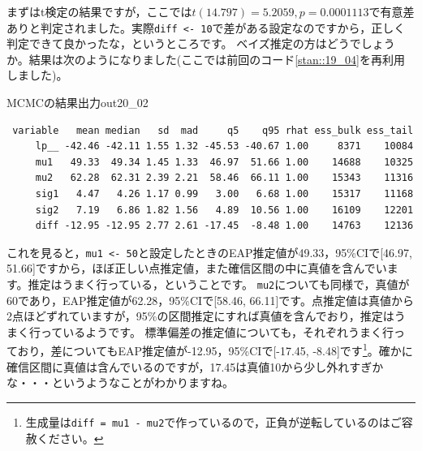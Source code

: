 \documentclass{ltjsbook}
\begin{document}
まずはt検定の結果ですが，ここでは$t(14.797)=5.2059,p=0.0001113$で有意差ありと判定されました。実際\verb|diff <- 10|で差がある設定なのですから，正しく判定できて良かったな，というところです。
ベイズ推定の方はどうでしょうか。結果は次のようになりました(ここでは前回のコード\ref{stan::19_04}を再利用しました)。
\begin{SCcmd}{MCMCの結果出力}{out20_02}
\begin{verbatim}
 variable   mean median   sd  mad     q5    q95 rhat ess_bulk ess_tail
     lp__ -42.46 -42.11 1.55 1.32 -45.53 -40.67 1.00     8371    10084
     mu1   49.33  49.34 1.45 1.33  46.97  51.66 1.00    14688    10325
     mu2   62.28  62.31 2.39 2.21  58.46  66.11 1.00    15343    11316
     sig1   4.47   4.26 1.17 0.99   3.00   6.68 1.00    15317    11168
     sig2   7.19   6.86 1.82 1.56   4.89  10.56 1.00    16109    12201
     diff -12.95 -12.95 2.77 2.61 -17.45  -8.48 1.00    14763    12136
\end{verbatim}
\end{SCcmd}
これを見ると，\verb|mu1 <- 50|と設定したときのEAP推定値が49.33，95\%CIで[46.97, 51.66]ですから，ほぼ正しい点推定値，また確信区間の中に真値を含んでいます。推定はうまく行っている，ということです。
\verb|mu2|についても同様で，真値が60であり，EAP推定値が62.28，95\%CIで[58.46, 66.11]です。点推定値は真値から2点ほどずれていますが，95\%の区間推定にすれば真値を含んでおり，推定はうまく行っているようです。
標準偏差の推定値についても，それぞれうまく行っており，差についてもEAP推定値が-12.95，95\%CIで[-17.45, -8.48]です\footnote{生成量は\verb|diff = mu1 - mu2|で作っているので，正負が逆転しているのはご容赦ください。}。確かに確信区間に真値は含んでいるのですが，17.45は真値10から少し外れすぎかな・・・というようなことがわかりますね。
\end{document}
